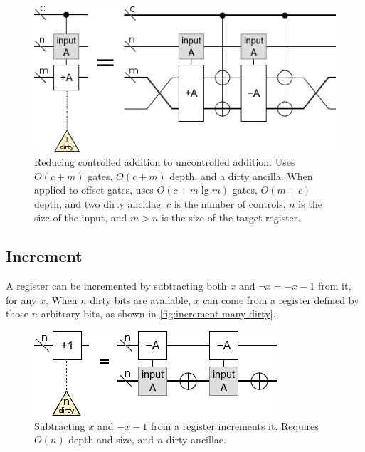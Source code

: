 \documentclass[twocolumn,longbibliography]{quantumarticle}
\begin{document}
\begin{figure}
  \centering
  \includegraphics[width=\linewidth]{assets/controlled-addition.png}
  \caption{
    Reducing controlled addition to uncontrolled addition.
    Uses $O(c + m)$ gates, $O(c + m)$ depth, and a dirty ancilla.
    When applied to offset gates, uses $O(c + m \lg m)$ gates, $O(m + c)$ depth, and two dirty ancillae.
    $c$ is the number of controls, $n$ is the size of the input, and $m > n$ is the size of the target register.
  }
  \label{fig:controlled-addition}
\end{figure}


\subsection{Increment}

A register can be incremented by subtracting both $x$ and $\neg x = -x-1$ from it, for any $x$.
When $n$ dirty bits are available, $x$ can come from a register defined by those $n$ arbitrary bits, as shown in \autoref{fig:increment-many-dirty}.

\begin{figure}
  \centering
  \includegraphics[width=\linewidth]{assets/increment-many-dirty.png}
  \caption{ Subtracting $x$ and $-x-1$ from a register increments it. Requires $O(n)$ depth and size, and $n$ dirty ancillae.}
  \label{fig:increment-many-dirty}
\end{figure}
\end{document}
